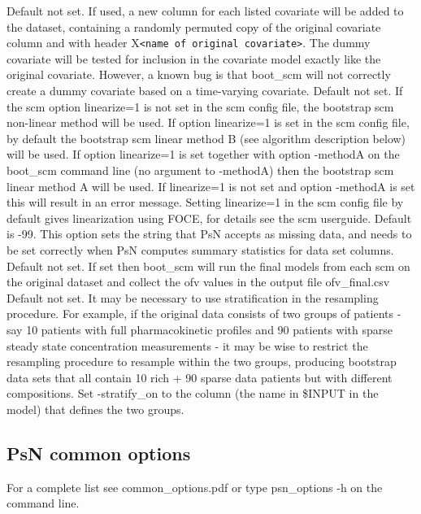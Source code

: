 \begin{optionlist}
Default not set. If used, a new column for each listed covariate will be added to the dataset, 													  
containing a randomly permuted copy of the original covariate column and with header X\verb|<name of original covariate>|. 
The dummy covariate will be tested for inclusion in the covariate model exactly like the original covariate. 
However, a known bug is that boot\_scm will not correctly create a dummy covariate based on a time-varying covariate.
\nextopt
{}
Default not set. If the scm option linearize=1 is not set in the scm config file, 
the bootstrap scm non-linear method will be used. If option linearize=1 is set in the scm config file, 
by default the bootstrap scm linear method B (see algorithm description below) will be used. 
If option linearize=1 is set together with option -methodA on the boot\_scm command line (no argument to -methodA) 
then the bootstrap scm linear method A will be used. If linearize=1 is not set and option -methodA is set this will result in an error message.  
Setting linearize=1 in the scm config file by default gives linearization using FOCE, for details see the scm userguide.
\nextopt
{}
Default is -99. This option sets the string that PsN accepts as missing data, and needs to be set correctly when PsN computes summary statistics for data set columns.
\nextopt
{}
Default not set. If set then boot\_scm will run the final models from each scm on the original dataset and collect the ofv values 
in the output file ofv\_final.csv   
\nextopt
{}
Default not set. It may be necessary to use stratification in the resampling procedure. For example, if the original 
data consists of two groups of patients - say 10 patients with full pharmacokinetic profiles and 90 patients with sparse 
steady state concentration measurements - it may be wise to restrict the resampling procedure to resample within the two 
groups, producing bootstrap data sets that all contain 10 rich + 90 sparse data patients but with different compositions. 
Set -stratify\_on to the column (the name in \$INPUT in the model) that defines the two groups.
\nextopt
\end{optionlist}

\subsection{PsN common options}
For a complete list see common\_options.pdf or type psn\_options -h on the command line.

